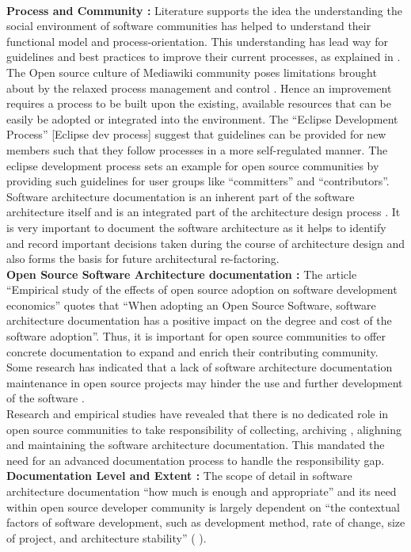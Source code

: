 \indent
\\\indent \textbf{Process and Community : } Literature supports the idea the understanding the social environment of software communities has helped to understand their functional model and process-orientation. This understanding has lead way for guidelines and best practices to improve their current processes, as explained in \cite{bab2009}. The Open source culture of Mediawiki community poses limitations brought about by the relaxed process management and control \cite{6923128}. Hence an improvement requires a process to be built upon the existing, available resources that can be easily be adopted or integrated into the environment. The \enquote{Eclipse Development Process} [Eclipse dev process] suggest that guidelines can be provided for new members such that they follow processes in a more self-regulated manner. The eclipse development process sets an example for open source communities by providing such guidelines for user groups like \enquote{committers} and \enquote{contributors}.
\\\indent Software architecture documentation is an inherent part of the software architecture itself and is an integrated part of the architecture design process \cite{Shahin2009}. It is very important to document the software architecture as it helps to identify and record important decisions taken during the course of architecture design and also forms the basis for future architectural re-factoring.
\newline
\\\indent \textbf{Open Source Software Architecture documentation : } The article \enquote{Empirical study of the effects of open source adoption on software development economics} \cite{Ajila2007} quotes that \enquote{When adopting an Open Source Software, software architecture documentation has a positive impact on the degree and cost of the software adoption}. Thus, it is important for open source communities to offer concrete documentation to expand and enrich their contributing community. Some research has indicated that a lack of software architecture documentation maintenance in open source projects may hinder the use and further development of the software \cite{michlmayr:quality_problems}.
\\\indent Research and empirical studies \cite{6923128} have revealed that there is no dedicated role in open source communities to take responsibility of collecting, archiving , alighning and maintaining the software architecture documentation. This mandated the need for an advanced documentation process to handle the responsibility gap.
\newline
\\\indent \textbf{Documentation Level and Extent : } The scope of detail in software architecture documentation \enquote{how much is enough and appropriate} and its need within open source developer community is largely dependent on \enquote{the contextual factors of software development, such as development method, rate of change, size of project, and architecture stability} (\cite{SMR:SMR572} \cite{Briand2003}).
